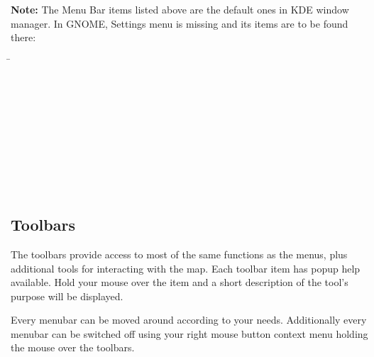 \textbf{Note:} \nix The Menu Bar items listed above are the default ones in KDE window
manager. In GNOME, Settings menu is missing and its items are to be found
there:
\begin{tabbing}
 \hspace{3cm}\=
 \\
 \hspace{3cm}\>
\\
 \hspace{3cm}\>
\\
 \hspace{3cm}\>
\\
\hspace{3cm}\>
 \\
 \hspace{3cm}\>
 \\
   \hspace{3cm}\>
 \\
 \hspace{3cm}\>
 \\
 \hspace{3cm}\>
 \\
 \hspace{3cm}\>
 \\
\end{tabbing}


\subsection{Toolbars}\label{label_toolbars}

The toolbars provide access to most of the same functions as the menus,
plus additional tools for interacting with the map. Each toolbar item has
popup help available. Hold your mouse over the item and a short description of
the tool's purpose will be displayed. 

Every menubar can be moved around according to your needs. Additionally every
menubar can be switched off using your right mouse button context menu holding
the mouse over the toolbars.

